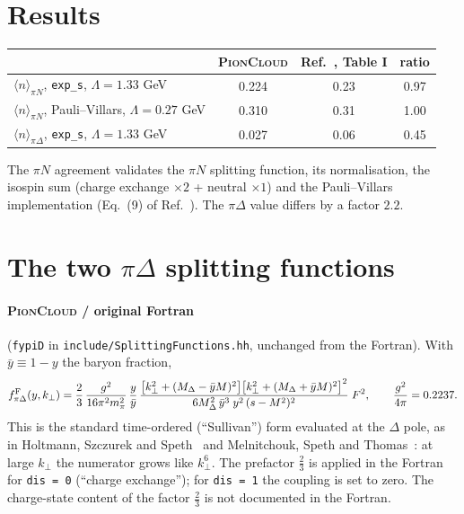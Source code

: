 \documentclass[11pt,a4paper]{article}
\newcommand{\picloud}{\textsc{PionCloud}}
\newcommand{\kT}{k_\perp}
\begin{document}
\section{Results}

\begin{center}
\begin{tabular}{lccc}
\toprule
 & \picloud{} & Ref.~\cite{McK16}, Table I & ratio \\
\midrule
$\langle n\rangle_{\pi N}$, \texttt{exp\_s}, $\Lambda=1.33$ GeV & 0.224 & 0.23 & 0.97 \\
$\langle n\rangle_{\pi N}$, Pauli--Villars, $\Lambda=0.27$ GeV & 0.310 & 0.31 & 1.00 \\
$\langle n\rangle_{\pi\Delta}$, \texttt{exp\_s}, $\Lambda=1.33$ GeV & 0.027 & 0.06 & 0.45 \\
\bottomrule
\end{tabular}
\end{center}

The $\pi N$ agreement validates the $\pi N$ splitting function, its
normalisation, the isospin sum (charge exchange $\times2$ + neutral $\times1$)
and the Pauli--Villars implementation (Eq.~(9) of Ref.~\cite{McK16}).  The
$\pi\Delta$ value differs by a factor $2.2$.

\section{The two $\pi\Delta$ splitting functions}

\paragraph{\picloud{} / original Fortran} (\texttt{fypiD} in
\texttt{include/SplittingFunctions.hh}, unchanged from the Fortran).  With
$\bar y\equiv1-y$ the baryon fraction,
\begin{equation}
f^{\rm F}_{\pi\Delta}(y,\kT)=\frac23\,\frac{g^2}{16\pi^2 m_\pi^2}\,\frac{y}{\bar y}\,
\frac{\big[\kT^2+(M_\Delta-\bar yM)^2\big]\big[\kT^2+(M_\Delta+\bar yM)^2\big]^2}
     {6M_\Delta^2\,\bar y^3\; y^2\,(s-M^2)^2}\;F^2,
\qquad \frac{g^2}{4\pi}=0.2237 .
\label{eq:F}
\end{equation}
This is the standard time-ordered (``Sullivan'') form evaluated at the
$\Delta$ pole, as in Holtmann, Szczurek and Speth~\cite{HSS96} and Melnitchouk,
Speth and Thomas~\cite{MST99}: at large $\kT$ the numerator grows like $\kT^6$.
The prefactor $\tfrac23$ is applied in the Fortran for
\texttt{dis = 0} (``charge exchange''); for \texttt{dis = 1} the coupling is
set to zero.  The charge-state content of the factor $\tfrac23$ is not
documented in the Fortran.
\end{document}
